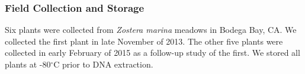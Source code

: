 
\subsubsection{\textbf{Field Collection and Storage}}

    Six plants were collected from \textit{Zostera marina} meadows in Bodega Bay, CA. We collected the first plant in late November of 2013. The other five plants were collected in early February of 2015 as a follow-up study of the first. We stored all plants at -80$^{\circ}$C prior to DNA extraction. 
    
    
    
    
    
    